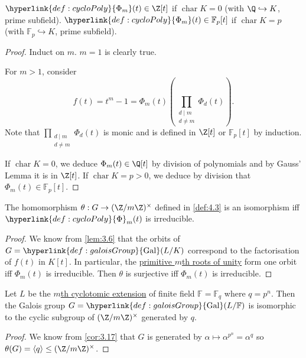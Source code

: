 \documentclass{article}
\DeclareMathOperator{\chara}{char}
\DeclareMathOperator{\Gal}{Gal}
\newcommand{\F}{\mathbb{F}}
\begin{document}
\begin{nlemma}\label{lem:4.5}
    $\hyperlink{def:cycloPoly}{\Phi_m}(t) \in \Z[t]$ if $\chara K = 0$ (with $\Q \hookrightarrow K$, prime subfield).
    $\hyperlink{def:cycloPoly}{\Phi_m}(t) \in \F_p[t]$ if $\chara K = p$ (with $\F_p \hookrightarrow K$, prime subfield).
\end{nlemma}

\begin{proof}
    Induct on $m$. $m=1$ is clearly true.

    For $m>1$, consider
    \begin{equation*}
        f(t) = t^m - 1 = \Phi_m(t) \left(\prod_{\substack{d \mid m \\ d \neq m}} \Phi_d(t)\right).
    \end{equation*}
    Note that $\prod_{\substack{d \mid m \\ d \neq m}} \Phi_d(t)$ is monic and is defined in $\Z[t]$ or $\F_p[t]$ by induction.

    If $\chara K = 0$, we deduce $\Phi_m(t) \in \Q[t]$ by division of polynomials and by Gauss' Lemma it is in $\Z[t]$.
    If $\chara K = p > 0$, we deduce by division that $\Phi_m(t) \in \F_p[t]$.
\end{proof}

\begin{nlemma}\label{lem:4.6}
    The homomorphism $\theta: G \to (\Z/m\Z)^\times$ defined in \cref{def:4.3} is an isomorphism iff $\hyperlink{def:cycloPoly}{\Phi}_m(t)$ is irreducible.
\end{nlemma}

\begin{proof}
    We know from \cref{lem:3.6} that the orbits of $G = \hyperlink{def:galoisGroup}{\Gal}(L/K)$ correspond to the factorisation of $f(t)$ in $K[t]$.
    In particular, the \hyperlink{def:primRoot}{primitive $m$th roots of unity} form one orbit iff $\Phi_m(t)$ is irreducible.
    Then $\theta$ is surjective iff $\Phi_m(t)$ is irreducible.
\end{proof}

\begin{nthm}\label{thm:4.7}
    Let $L$ be the \hyperlink{def:cycloExt}{$m$th cyclotomic extension} of finite field $\F = \F_q$ where $q = p^n$.
    Then the Galois group $G = \hyperlink{def:galoisGroup}{\Gal}(L/\F)$ is isomorphic to the cyclic subgroup of $(\Z/m\Z)^\times$ generated by $q$.
\end{nthm}

\begin{proof}
    We know from \cref{cor:3.17} that $G$ is generated by $\alpha \mapsto \alpha^{p^n} = \alpha^q$ so $\theta(G) = \langle q\rangle \leq (\Z/m\Z)^\times$.
\end{proof}
\end{document}
